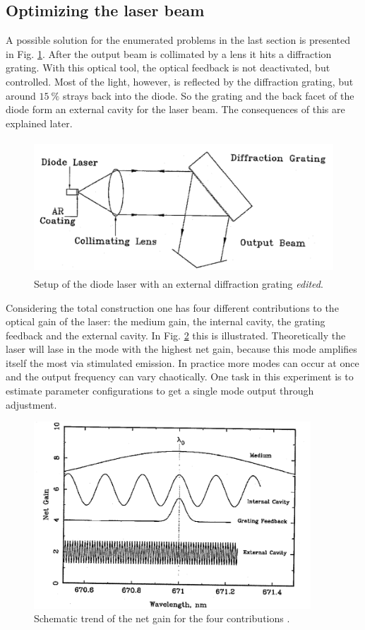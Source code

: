\subsection{Optimizing the laser beam}
\label{sec:Optimizing}

A possible solution for the enumerated problems in the last section is presented in Fig. \ref{fig:diffraction}.
After the output beam is collimated by a lens it hits a diffraction grating. With this optical tool, the optical
feedback is not deactivated, but controlled. Most of the light, however, is reflected by the diffraction grating,
but around $\SI{15}{\percent}$ strays back into the diode. So the grating and the back facet of the diode form
an external cavity for the laser beam. The consequences of this are explained later.

\begin{figure}
  \centering
  \includegraphics[height=5cm]{Ordnername/diffraction_edit.pdf}
  \caption{Setup of the diode laser with an external diffraction grating \cite{manual} \textit{edited}.}
  \label{fig:diffraction}
\end{figure}

Considering the total construction one has four different contributions to the optical gain of the laser:
the medium gain, the internal cavity, the grating feedback and the external cavity.
In Fig. \ref{fig:optgain} this is illustrated. Theoretically the laser will lase in the mode with the
highest net gain, because this mode amplifies itself the most via stimulated emission. In practice more
modes can occur at once and the output frequency can vary chaotically. One task in this experiment is to
estimate parameter configurations to get a single mode output through adjustment.

\begin{figure}
  \centering
  \includegraphics[height=7cm]{Ordnername/optgain.png}
  \caption{Schematic trend of the net gain for the four contributions \cite{manual}.}
  \label{fig:optgain}
\end{figure}

